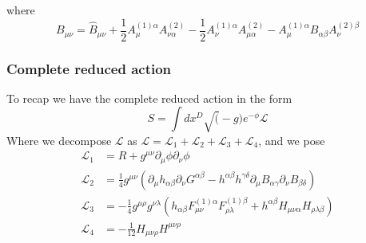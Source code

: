 \documentclass{article}
\begin{document}
where
\begin{equation}
    B_{\mu \nu } = \hat B_{\mu \nu} +\frac{1}{2}A^{(1)\alpha}_\mu A^{(2)}_{\nu \alpha}-\frac{1}{2}A^{(1)\alpha}_\nu A^{(2)}_{\mu \alpha} -A^{(1)\alpha}_\mu B_{\alpha \beta }A^{(2)\beta}_{\nu }
\end{equation}
\subsubsection{Complete reduced action}
To recap we have the complete reduced action in the form
\begin{equation}
    S =  \int dx^D \sqrt(-g)e^{-\phi} \mathcal{L}
\end{equation}
Where we decompose $\mathcal{L}$ as $\mathcal{L} = \mathcal{L}_1 + \mathcal{L}_2 + \mathcal{L}_3 +\mathcal{L}_4$, and we pose
\begin{equation} \label{eq:38}
    \boxed{
    \begin{aligned}
        \mathcal{L}_1 &= R +g^{\mu \nu}\partial_{\mu }\phi \partial_{\nu} \phi\\
        \mathcal{L}_2 &=\frac{1}{4}g^{\mu \nu }(\partial_\mu h_{\alpha \beta}\partial_\nu G^{\alpha \beta} - h^{\alpha \beta } h^{\gamma \delta}\partial_\mu B_{\alpha \gamma} \partial_\nu B_{\beta \delta})\\
        \mathcal{L}_3 &= -\frac{1}{4}g^{\mu \rho}g^{\nu \lambda}(h_{\alpha\beta}F^{(1)\alpha}_{\mu \nu}F^{(1)\beta}_{\rho \lambda}+h^{\alpha \beta}H_{\mu \nu \alpha}H_{\rho \lambda \beta })\\
        \mathcal{L}_4 &= -\frac{1}{12}H_{\mu \nu \rho} H^{\mu \nu \rho}
    \end{aligned}}
\end{equation}
\end{document}
